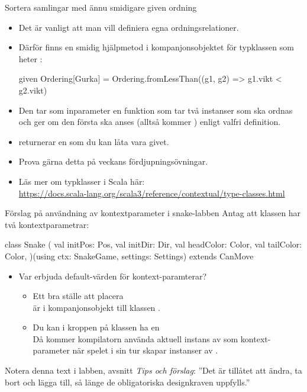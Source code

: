 \begin{Slide}{Sortera samlingar med ännu smidigare given ordning}\SlideFontSmall

\begin{itemize}
  \item Det är vanligt att man vill definiera egna ordningsrelationer.
  \item Därför finns en smidig hjälpmetod i kompanjonsobjektet för typklassen  som heter :
\begin{Code}
given Ordering[Gurka] = 
  Ordering.fromLessThan((g1, g2) => g1.vikt < g2.vikt)
\end{Code}
 
  \item Den tar som inparameter en funktion som tar två instanser som ska ordnas och ger  om den första ska anses  (alltså kommer ) enligt valfri definition. 
  \item {} returnerar en  som du kan låta vara givet.
  \item Prova gärna detta på veckans fördjupningsövningar.
  \item Läs mer om typklasser i Scala här: \\ \url{https://docs.scala-lang.org/scala3/reference/contextual/type-classes.html}
\end{itemize}

\end{Slide}

\begin{Slide}{Förslag på användning av kontextparameter i snake-labben}\SlideFontSmall
Antag att klassen  har två kontextparametrar:
\begin{Code}
class Snake (
  val initPos: Pos,
  val initDir: Dir,
  val headColor: Color,
  val tailColor: Color,
  )(using ctx: SnakeGame, settings: Settings) extends CanMove
\end{Code}
\begin{itemize}
  \item Var erbjuda default-värden för kontext-paramterar? \pause
  \begin{itemize}\SlideFontTiny
    \item Ett bra ställe att placera  \\är i kompanjonsobjekt till klassen .
  \item Du kan i kroppen på klassen  ha en  \\Då kommer kompilatorn använda aktuell instans av  som kontext-parameter när spelet i sin tur skapar instanser av .
\end{itemize}
\end{itemize}
\pause
Notera denna text i labben, avsnitt \emph{Tips och förslag}: ''Det är tillåtet att ändra, ta bort och lägga till, så länge de obligatoriska designkraven uppfylls.''
\end{Slide}


